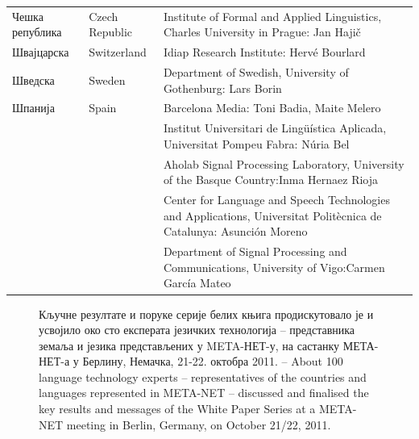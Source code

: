 \begin{longtable}{llp{114mm}}
  Чешка република & \textcolor{grey1}{Czech Republic} & Institute of Formal and Applied Linguistics, Charles University in Prague: Jan Hajič \\ \addlinespace
  Швајцарска & \textcolor{grey1}{Switzerland} & Idiap Research Institute: Hervé Bourlard \\ \addlinespace 
  Шведска & \textcolor{grey1}{Sweden} & Department of Swedish, University of Gothenburg: Lars Borin \\ \addlinespace 
  Шпанија &  \textcolor{grey1}{Spain} & Barcelona Media: Toni Badia, Maite Melero \\ \addlinespace 
  & & Institut Universitari de Lingüística Aplicada, Universitat Pompeu Fabra: Núria Bel \\ \addlinespace 
  & & Aholab Signal Processing Laboratory, University of the Basque Country:\newline Inma Hernaez Rioja \\ \addlinespace 
  & & Center for Language and Speech Technologies and Applications, Universitat Politècnica de Catalunya:  Asunción Moreno \\ \addlinespace 
  & & Department of Signal Processing and Communications, University of Vigo:\newline Carmen García Mateo  
    
\end{longtable}
\normalsize

\renewcommand*{\figureformat}{}
\renewcommand*{\captionformat}{}

\begin{figure}[htbp]
  \center
  \caption{Кључне резултате и поруке серије белих књига продискутовало је и усвојило око сто експерата језичких технологија  -- представника земаља и језика представљених у META-НЕТ-у, на састанку МЕТА-НЕТ-а у Берлину, Немачка, 21-22. октобра 2011. -- About 100 language technology experts – representatives of the countries and languages represented
in META-NET – discussed and finalised the key results and messages of the White Paper Series at a META-NET
meeting in Berlin, Germany, on October 21/22, 2011.}
  \medskip
\end{figure}


\label{whitepaperseries}

